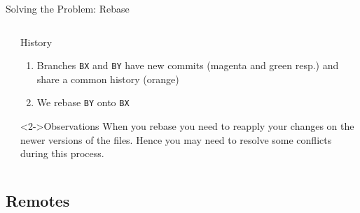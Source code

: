 \documentclass[xetex]{beamer}
\begin{document}
\begin{frame}[fragile]{Solving the Problem: Rebase}
\begin{columns}
\begin{column}{.5\linewidth}
    \end{column}
    \begin{column}{.5\linewidth}
      \begin{exampleblock}{History}
        \begin{enumerate}
          \item Branches \texttt{BX} and \texttt{BY} have new commits (magenta
            and green resp.) and share a common history (orange)
          \item We rebase \texttt{BY} onto \texttt{BX}
        \end{enumerate}
      \end{exampleblock}
      \begin{alertblock}<2->{Observations}
        When you rebase you need to reapply your changes on the newer versions
        of the files. Hence you may need to resolve some conflicts during this process.
      \end{alertblock}
    \end{column}
  \end{columns}
\end{frame}

\subsection{Remotes}
\end{document}
